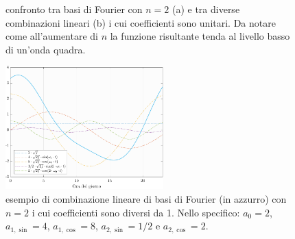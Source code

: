 \begin{figure}[htpb]
	\centering
	\quad
	\caption[Confronto tra basi di Fourier con $n=2$ e tra diverse combinazioni lineari]{confronto tra basi di Fourier con $n=2$ (a) e tra diverse combinazioni lineari (b) i cui coefficienti sono unitari. Da notare come all'aumentare di $n$ la funzione risultante tenda al livello basso di un'onda quadra.}
	\label{esempi_Fourier}
\end{figure}
\begin{figure}[htpb]
	\centering
	\includegraphics[height=180px]{Immagini/1. Modello base/Spline Fourier con coefficienti non unitari}
	\caption[Esempio di combinazione lineare di basi di Fourier con $n=2$ i cui coefficienti sono diversi da \num{1}]{esempio di combinazione lineare di basi di Fourier (in azzurro) con $n=2$ i cui coefficienti sono diversi da \num{1}. Nello specifico: $a_0 = 2$, $a_{1,\sin} = 4$, $a_{1,\cos} = 8$, $a_{2,\sin} = 1/2$ e $a_{2,\cos} = 2$.}
	\label{esempio_Fourier_coef_non_unitari}
\end{figure}

